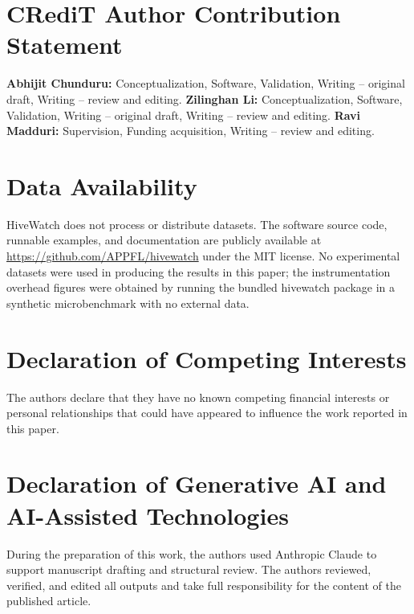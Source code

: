 \section*{CRediT Author Contribution Statement}
\textbf{Abhijit Chunduru:} Conceptualization, Software, Validation, Writing -- original draft, Writing -- review and editing.
\textbf{Zilinghan Li:} Conceptualization, Software, Validation, Writing -- original draft, Writing -- review and editing.
\textbf{Ravi Madduri:} Supervision, Funding acquisition, Writing -- review and editing.

\section*{Data Availability}
HiveWatch does not process or distribute datasets. The software source code, runnable examples, and documentation are publicly available at \url{https://github.com/APPFL/hivewatch} under the MIT license. No experimental datasets were used in producing the results in this paper; the instrumentation overhead figures were obtained by running the bundled hivewatch package in a synthetic microbenchmark with no external data.

\section*{Declaration of Competing Interests}
The authors declare that they have no known competing financial interests or personal relationships that could have appeared to influence the work reported in this paper.

\section*{Declaration of Generative AI and AI-Assisted Technologies}
During the preparation of this work, the authors used Anthropic Claude to support manuscript drafting and structural review. The authors reviewed, verified, and edited all outputs and take full responsibility for the content of the published article.
